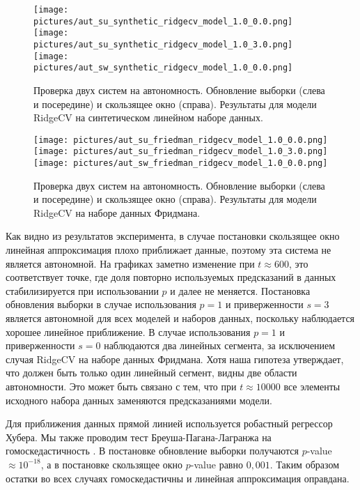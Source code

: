     \begin{figure}[h!]
        \centering
        \texttt{[image: pictures/aut\_su\_synthetic\_ridgecv\_model\_1.0\_0.0.png]}
        \texttt{[image: pictures/aut\_su\_synthetic\_ridgecv\_model\_1.0\_3.0.png]}
        \texttt{[image: pictures/aut\_sw\_synthetic\_ridgecv\_model\_1.0\_0.0.png]}
        
        \caption{Проверка двух систем на автономность. Обновление выборки (слева и посередине) и скользящее окно (справа). Результаты для модели RidgeCV на синтетическом линейном наборе данных.}
        \label{fig_exp_4_3}
    \end{figure}

    \begin{figure}[h!]
        \centering
        \texttt{[image: pictures/aut\_su\_friedman\_ridgecv\_model\_1.0\_0.0.png]}
        \texttt{[image: pictures/aut\_su\_friedman\_ridgecv\_model\_1.0\_3.0.png]}
        \texttt{[image: pictures/aut\_sw\_friedman\_ridgecv\_model\_1.0\_0.0.png]}
        
        \caption{Проверка двух систем на автономность. Обновление выборки (слева и посередине) и скользящее окно (справа). Результаты для модели RidgeCV на наборе данных Фридмана.}
        \label{fig_exp_4_4}
    \end{figure}

    Как видно из результатов эксперимента, в случае постановки скользящее окно линейная аппроксимация плохо приближает данные, поэтому эта система не является автономной. На графиках заметно изменение при $t \approx 600$, это соответствует точке, где доля повторно используемых предсказаний в данных стабилизируется при использовании $p$ и далее не меняется. Постановка обновления выборки в случае использования $p = 1$ и приверженности $s = 3$ является автономной для всех моделей и наборов данных, поскольку наблюдается хорошее линейное приближение. В случае использования $p = 1$ и приверженности $s = 0$ наблюдаются два линейных сегмента, за исключением случая RidgeCV на наборе данных Фридмана. Хотя наша гипотеза утверждает, что должен быть только один линейный сегмент, видны две области автономности. Это может быть связано с тем, что при $t \approx 10000$ все элементы исходного набора данных заменяются предсказаниями модели.

    Для приближения данных прямой линией используется робастный регрессор Хубера. Мы также проводим тест Бреуша-Пагана-Лагранжа на гомоскедастичность \citep{d1971omnibus}. В постановке обновление выборки получаются $p$-value $\approx 10^{-18}$, а в постановке скользящее окно $p$-value равно $0,001$. Таким образом остатки во всех случаях гомоскедастичны и линейная аппроксимация оправдана.

